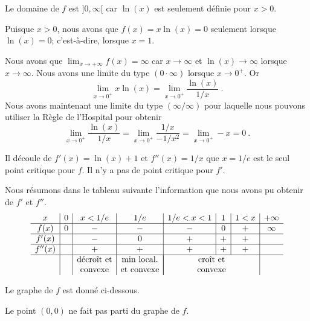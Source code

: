 { Le domaine de $f$ est $]0,\infty[$ car $\ln(x)$
est seulement définie pour $x>0$.

Puisque $x>0$, nous avons que $f(x) = x \ln(x) = 0$ seulement lorsque
$\ln(x) = 0$; c'est-à-dire, lorsque $x=1$.

Nous avons que $\displaystyle \lim_{x \to +\infty} f(x) = \infty$ car
$x \to \infty$ et $\ln(x) \to \infty$ lorsque $x \to \infty$.
Nous avons une limite du type $(0\cdot\infty)$ lorsque $x\to 0^+$.  Or
\[
\lim_{x\to 0^+}  x \ln(x) = \lim_{x\to 0^+} \frac{\ln(x)}{1/x} \ .
\]
Nous avons maintenant une limite du type $(\infty/\infty)$ pour laquelle nous
pouvons utiliser la Règle de l'Hospital pour obtenir
\[
\lim_{x\to 0^+} \frac{\ln(x)}{1/x}
= \lim_{x\to 0^+} \frac{1/x}{-1/x^2}
= \lim_{x\to 0^+} -x = 0 \ .
\]

Il découle de $f'(x) = \ln(x) + 1$ et $f''(x) = 1/x$ que $x= 1/e$
est le seul point critique pour $f$.  Il n'y a pas de point critique
pour $f'$.

Nous résumons dans le tableau suivante l'information que nous avons pu obtenir
de $f'$ et $f''$.
\[
\begin{array}{c|c|c|c|c|c|c|c}
x & 0 & x< 1/e & 1/e & 1/e <x< 1 & 1 & 1 < x & +\infty\\
\hline
f(x) & 0 & - & - & -  & 0 & + & \infty\\
\hline
f'(x) & & - & 0 & + & + & + &  \\
\hline
f''(x) & & + & + & + & + & + &  \\
\hline
& & \text{décroît et} & \text{min local.} &
\multicolumn{3}{|c|}{\text{croît et}} & \\
& & \text{convexe} & \text{et convexe} & \multicolumn{3}{|c|}{\text{convexe}} &
\end{array}
\]

Le graphe de $f$ est donné ci-dessous.

Le point $(0,0)$ ne fait pas parti du graphe de $f$.
}

